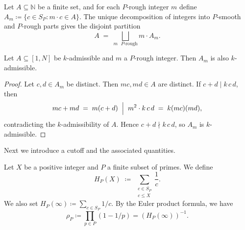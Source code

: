 \documentclass{amsart}
\begin{document}
\begin{observation}\label{obs:partition}
   Let $A \subseteq \mathbb{N}$ be a finite set, and for each $P$-rough
   integer $m$ define $A_m \coloneqq \{c \in S_P : m \cdot c \in A\}$.
   The unique decomposition of integers into $P$-smooth and $P$-rough
   parts gives the disjoint partition
   \begin{equation}
      A \;=\; \bigsqcup_{m \text{ $P$-rough}} m \cdot A_m.
   \end{equation}
\end{observation}

\begin{lemma}\label{lem:1}
   Let $A \subseteq [1, N]$ be $k$-admissible and $m$ a $P$-rough integer. Then $A_m$ is also $k$-admissible. 
\end{lemma}

\begin{proof}
Let $c, d \in A_m$ be distinct. Then $mc, md \in A$ are distinct. If $c + d \mid k\,c\,d$, then
\[
   mc + md \;=\; m(c + d) \;\Bigm|\; m^2 \cdot k\,c\,d \;=\; k(mc)(md),
\]
contradicting the $k$-admissibility of $A$. Hence $c + d \nmid k\,c\,d$, so $A_m$ is $k$-admissible.
\end{proof}

Next we introduce a cutoff and the associated quantities.
\begin{definition}
   Let $X$ be a positive integer and $P$ a finite subset of primes. We define
   \[
      H_P(X) \;\coloneqq\; \sum_{\substack{c \in S_P \\ c \leq X}} \frac{1}{c}.
   \]
   We also set $H_P(\infty) \coloneqq \sum_{c \in S_P} 1/c$. By the Euler product formula, we have
   \begin{equation}\label{eq:euler-prod}
   \rho_P \coloneqq \prod_{p \in P} (1 - 1/p) = \left(H_P(\infty)\right)^{-1}.
   \end{equation}
\end{definition}
\end{document}
